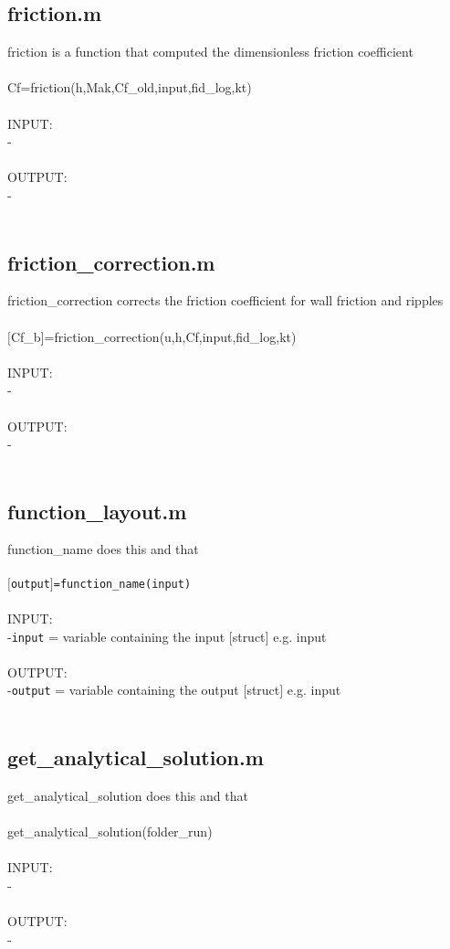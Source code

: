 \subsection{friction.m}
friction is a function that computed the dimensionless friction coefficient \\ 
 \\ 
Cf=friction(h,Mak,Cf\_old,input,fid\_log,kt) \\ 
 \\ 
INPUT: \\ 
   - \\ 
 \\ 
OUTPUT: \\ 
   - \\ 
 \\ 
\subsection{friction\_correction.m}
friction\_correction corrects the friction coefficient for wall friction and ripples \\ 
 \\ 
$[$Cf\_b$]$=friction\_correction(u,h,Cf,input,fid\_log,kt) \\ 
 \\ 
INPUT: \\ 
   - \\ 
 \\ 
OUTPUT: \\ 
   - \\ 
 \\ 
\subsection{function\_layout.m}
function\_name does this and that \\ 
 \\ 
\texttt{$[$output$]$=function\_name(input)} \\ 
 \\ 
INPUT: \\ 
   -\texttt{input} = variable containing the input $[$struct$]$ e.g. input \\ 
 \\ 
OUTPUT: \\ 
   -\texttt{output} = variable containing the output $[$struct$]$ e.g. input \\ 
 \\ 
\subsection{get\_analytical\_solution.m}
get\_analytical\_solution does this and that \\ 
 \\ 
get\_analytical\_solution(folder\_run) \\ 
 \\ 
INPUT: \\ 
   - \\ 
 \\ 
OUTPUT: \\ 
   - \\ 
 \\ 
